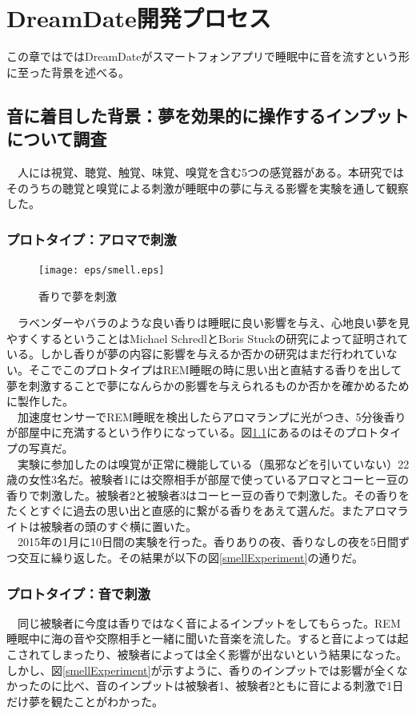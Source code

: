 \chapter{DreamDate開発プロセス}
\label{chap:visualize}

この章ではではDreamDateがスマートフォンアプリで睡眠中に音を流すという形に至った背景を述べる。

\section{音に着目した背景：夢を効果的に操作するインプットについて調査}
　人には視覚、聴覚、触覚、味覚、嗅覚を含む5つの感覚器がある。本研究ではそのうちの聴覚と嗅覚による刺激が睡眠中の夢に与える影響を実験を通して観察した。

\subsection{プロトタイプ：アロマで刺激}
\begin{figure}[htbp]
\begin{center}
\texttt{[image: eps/smell.eps]}
\caption{香りで夢を刺激}
\label{smell}
\end{center}
\end{figure}

　ラベンダーやバラのような良い香りは睡眠に良い影響を与え、心地良い夢を見やすくするということはMichael SchredlとBoris Stuckの研究によって証明されている\cite{roseDream}。しかし香りが夢の内容に影響を与えるか否かの研究はまだ行われていない。そこでこのプロトタイプはREM睡眠の時に思い出と直結する香りを出して夢を刺激することで夢になんらかの影響を与えられるものか否かを確かめるために製作した。\\
　加速度センサーでREM睡眠を検出したらアロマランプに光がつき、5分後香りが部屋中に充満するという作りになっている。図\ref{smell}にあるのはそのプロトタイプの写真だ。\\
　実験に参加したのは嗅覚が正常に機能している（風邪などを引いていない）22歳の女性3名だ。被験者1には交際相手が部屋で使っているアロマとコーヒー豆の香りで刺激した。被験者2と被験者3はコーヒー豆の香りで刺激した。その香りをたくとすぐに過去の思い出と直感的に繋がる香りをあえて選んだ。またアロマライトは被験者の頭のすぐ横に置いた。\\
　2015年の1月に10日間の実験を行った。香りありの夜、香りなしの夜を5日間ずつ交互に繰り返した。その結果が以下の図\ref{smellExperiment}の通りだ。

\subsection{プロトタイプ：音で刺激}
　同じ被験者に今度は香りではなく音によるインプットをしてもらった。REM睡眠中に海の音や交際相手と一緒に聞いた音楽を流した。すると音によっては起こされてしまったり、被験者によっては全く影響が出ないという結果になった。しかし、図\ref{smellExperiment}が示すように、香りのインプットでは影響が全くなかったのに比べ、音のインプットは被験者1、被験者2ともに音による刺激で1日だけ夢を観たことがわかった。

